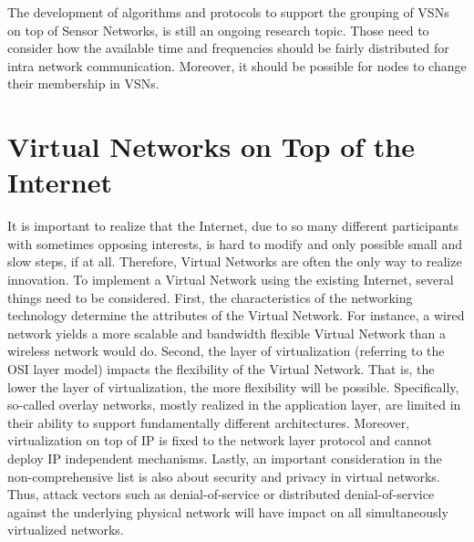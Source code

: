 The development of algorithms and protocols to support the grouping of VSNs on top of Sensor Networks, is still an ongoing research topic. Those need to consider how the available time and frequencies should be fairly distributed for intra network communication. Moreover, it should be possible for nodes to change their membership in VSNs.


\section{Virtual Networks on Top of the Internet}
It is important to realize that the Internet, due to so many different participants with sometimes opposing interests, is hard to modify and only possible small and slow steps, if at all. Therefore, Virtual Networks are often the only way to realize innovation. To implement a Virtual Network using the existing Internet, several things need to be considered. First, the characteristics of the networking technology determine the attributes of the Virtual Network. For instance, a wired network yields a more scalable and bandwidth flexible Virtual Network than a wireless network would do. \cite{Chowdhury} Second, the layer of virtualization (referring to the OSI layer model) impacts the flexibility of the Virtual Network. That is, the lower the layer of virtualization, the more flexibility will be possible. Specifically, so-called overlay networks, mostly realized in the application layer, are limited in their ability to support fundamentally different architectures. \cite{Chowdhury} Moreover, virtualization on top of IP is fixed to the network layer protocol and cannot deploy IP independent mechanisms.  \cite{Chowdhury} Lastly, an important consideration in the non-comprehensive list is also about security and privacy in virtual networks. Thus, attack vectors such as denial-of-service or distributed denial-of-service against the underlying physical network will have impact on all simultaneously virtualized networks.

